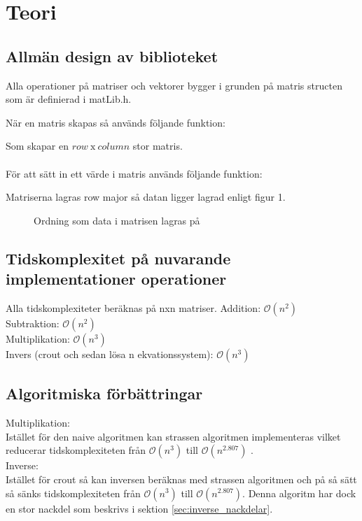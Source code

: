 \section{Teori}

\subsection{Allmän design av biblioteket}
Alla operationer på matriser och vektorer bygger i grunden på matris structen som är definierad i matLib.h.

När en matris skapas så används följande funktion:

Som skapar en $row \ \text{x} \ column$ stor matris. \\ \\
För att sätt in ett värde i matris används följande funktion:

Matriserna lagras row major så datan ligger lagrad enligt figur 1. 
\begin{figure}[h]
\center
\scalebox{0.8}{}
\caption{Ordning som data i matrisen lagras på}
\end{figure}


\subsection{Tidskomplexitet på nuvarande implementationer operationer}
Alla tidskomplexiteter beräknas på nxn matriser.
Addition: $\mathcal{O}(n^2)$\\
Subtraktion: $\mathcal{O}(n^2)$\\
Multiplikation: $\mathcal{O}(n^3)$\\
Invers (crout och sedan lösa n ekvationssystem): $\mathcal{O}(n^3)$\\ 

\subsection{Algoritmiska förbättringar}
Multiplikation:\\
Istället för den naive algoritmen kan strassen algoritmen implementeras vilket reducerar tidskomplexiteten från $\mathcal{O}(n^3)$ till $\mathcal{O}(n^{2.807})$ \cite{Strassen1969}. \\
Inverse:\\
Istället för crout så kan inversen beräknas med strassen algoritmen och på så sätt så sänks tidskomplexiteten från $\mathcal{O}(n^3)$ till $\mathcal{O}(n^{2.807})$. Denna algoritm har dock en stor nackdel som beskrivs i sektion \ref{sec:inverse_nackdelar}.

